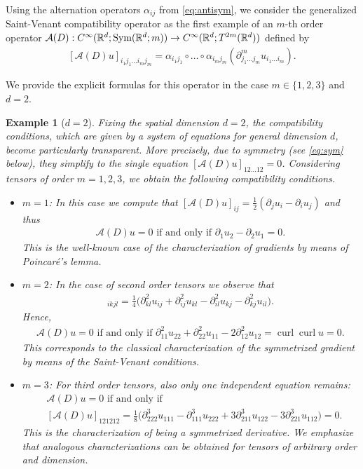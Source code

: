 \documentclass[a4paper, 10pt, twoside, notitlepage]{amsart}
\theoremstyle{plain}
\newtheorem{example}[prop]{Example}
\newcommand{\R}{\mathbb{R}}
\newcommand{\p}{\partial}
\newcommand{\A}{\mathcal{A}}
\renewcommand{\S}[1]{\textup{Sym}(\R^d;#1)}
\DeclareMathOperator{\curl}{curl}
\begin{document}
	
	Using the alternation operators $\alpha_{i j}$ from \cref{eq:antisym}, we consider the generalized Saint-Venant compatibility operator as the first example of an $m$-th order operator $\A(D): C^\infty(\R^d;\S{m}) \to C^\infty(\R^d;T^{2m}(\R^d))$ defined by
	\begin{align} \label{eq:Operator} [\A(D) u]_{i_1j_1 \dots i_m j_m} = \alpha_{i_1 j_1} \circ \dots \circ \alpha_{i_m j_m} (\p^m_{j_1 \dots j_m} u_{i_1 \dots i_m}).
	\end{align}

We provide the explicit formulas for this operator in the case $m\in \{1,2,3\}$ and $d=2$.	
	
	\begin{example}[$d=2$]\label{ex:d-and-m}
		Fixing the spatial dimension $d=2$, the compatibility conditions, which are given by a system of equations for general dimension $d$, become particularly transparent. More precisely, due to
		symmetry (see \cref{eq:sym} below), they simplify to the single equation $[\A(D)u]_{12\dots12} = 0$. Considering tensors of order $m=1,2,3$, we obtain the following compatibility conditions.
		\begin{itemize}
			\item \underline{$m=1$}: In this case we compute that $[\A(D)u]_{ij} =\frac{1}{2}( \p_j u_i - \p_i u_j)$ and thus
			\begin{align*}
				\A(D)u = 0 \text{ if and only if } \p_1 u_2 - \p_2 u_1 = 0.
			\end{align*}
			This is the well-known case of the characterization of gradients by means of Poincar\'e's lemma.
			\item \underline{$m=2$}: In the case of second order tensors we observe that
			\begin{align*} [\A(D)u]_{ikjl} = \frac{1}{4} \big( \p^2_{kl} u_{ij} + \p^2_{ij} u_{kl} - \p^2_{il} u_{kj} - \p^2_{kj} u_{il} \big).
			\end{align*}
			Hence,
			\begin{align*}
				\A(D)u = 0 \text{ if and only if } \p^2_{11} u_{22} + \p^2_{22} u_{11} - 2 \p^2_{12}u_{12} = \curl \curl u = 0.
			\end{align*}
			This corresponds to the classical characterization of the symmetrized gradient by means of the Saint-Venant conditions.
			\item \underline{$m=3$}: For third order tensors, also only one independent equation remains:
			\begin{align*}
				&\A(D)u = 0 \text{ if and only if } \\
				&[\A(D)u]_{121212} = \frac{1}{8} \big( \p^3_{222} u_{111} - \p^3_{111} u_{222} + 3 \p^3_{211} u_{122} - 3 \p^3_{221} u_{112}\big) = 0.
			\end{align*}
			This is the characterization of being a symmetrized derivative. We emphasize that analogous characterizations can be obtained for tensors of arbitrary order and dimension.
		\end{itemize}
	\end{example}
	
\end{document}
